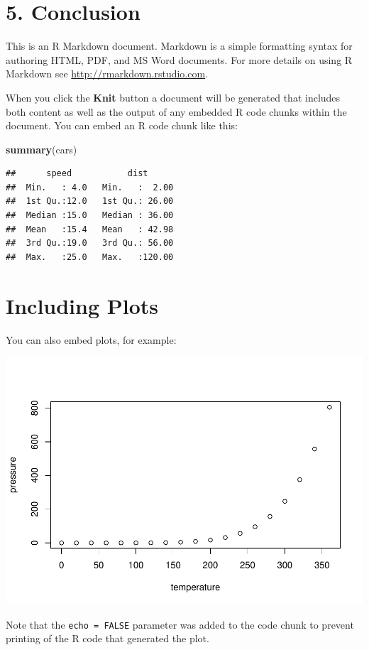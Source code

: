 \documentclass[11pt,]{article}
\newenvironment{Shaded}{\begin{snugshade}}{\end{snugshade}}
\newcommand{\KeywordTok}[1]{\textcolor[rgb]{0.13,0.29,0.53}{\textbf{#1}}}
\newcommand{\NormalTok}[1]{#1}
\begin{document}
\hypertarget{conclusion}{%
\section{5. Conclusion}\label{conclusion}}

This is an R Markdown document. Markdown is a simple formatting syntax
for authoring HTML, PDF, and MS Word documents. For more details on
using R Markdown see \url{http://rmarkdown.rstudio.com}.

When you click the \textbf{Knit} button a document will be generated
that includes both content as well as the output of any embedded R code
chunks within the document. You can embed an R code chunk like this:

\begin{Shaded}
\begin{Highlighting}[]
\KeywordTok{summary}\NormalTok{(cars)}
\end{Highlighting}
\end{Shaded}

\begin{verbatim}
##      speed           dist       
##  Min.   : 4.0   Min.   :  2.00  
##  1st Qu.:12.0   1st Qu.: 26.00  
##  Median :15.0   Median : 36.00  
##  Mean   :15.4   Mean   : 42.98  
##  3rd Qu.:19.0   3rd Qu.: 56.00  
##  Max.   :25.0   Max.   :120.00
\end{verbatim}

\hypertarget{including-plots}{%
\section{Including Plots}\label{including-plots}}

You can also embed plots, for example:

\includegraphics{Report_files/figure-latex/pressure-1.pdf}

Note that the \texttt{echo\ =\ FALSE} parameter was added to the code
chunk to prevent printing of the R code that generated the plot.

\newpage
\singlespacing 

\end{document}
